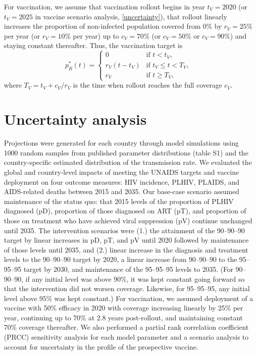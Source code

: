 \documentclass{article}
\begin{document}
For vaccination, we assume that vaccination rollout begins in year
$t_V = 2020$ (or $t_V = 2025$ in vaccine scenario analysis,
\autoref{uncertainty}), that rollout linearly increases the proportion
of non-infected population covered from 0\% by $r_V = 25\%$ per year
(or $r_V = 10\%$ per year) up to $c_V = 70\%$ (or $c_V = 50\%$ or
$c_V = 90\%$) and staying constant thereafter.  Thus, the vaccination
target is
\begin{equation}
  \label{vaccination_target}
  p_R^*(t) =
  \begin{cases}
    0 & \text{if $t < t_V$},
    \\
    r_V (t - t_V) & \text{if $t_V \leq t < T_V$},
    \\
    c_V & \text{if $t \geq T_V$},
  \end{cases}
\end{equation}
where $T_V = t_V + c_V / r_V$ is the time when rollout reaches
the full coverage $c_V$.


\section{Uncertainty analysis}
\label{uncertainty}

Projections were generated for each country through model simulations
using 1000 random samples from published parameter distributions
(table S1) and the country-specific estimated distribution of the
transmission rate. We evaluated the global and country-level impacts
of meeting the UNAIDS targets and vaccine deployment on four outcome
measures: HIV incidence, PLHIV, PLAIDS, and AIDS-related deaths
between 2015 and 2035. Our base-case scenario assumed maintenance of
the status quo: that 2015 levels of the proportion of PLHIV diagnosed
(pD), proportion of those diagnosed on ART (pT), and proportion of
those on treatment who have achieved viral suppression (pV) continue
unchanged until 2035. The intervention scenarios were (1.) the
attainment of the 90–90–90 target by linear increases in pD, pT, and
pV until 2020 followed by maintenance of those levels until 2035, and
(2.) linear increase in the diagnosis and treatment levels to the
90–90–90 target by 2020, a linear increase from 90–90–90 to the
95–95–95 target by 2030, and maintenance of the 95–95–95 levels to
2035. (For 90–90–90, if any initial level was above 90\%, it was kept
constant going forward so that the intervention did not worsen
coverage.  Likewise, for 95–95–95, any initial level above 95\% was
kept constant.)  For vaccination, we assumed deployment of a vaccine
with 50\% efficacy in 2020 with coverage increasing linearly by 25\%
per year, continuing up to 70\% at 2.8 years post-rollout, and
maintaining constant 70\% coverage thereafter.  We also performed a
partial rank correlation coefficient (PRCC) sensitivity analysis for
each model parameter and a scenario analysis to account for
uncertainty in the profile of the prospective vaccine.
\end{document}
